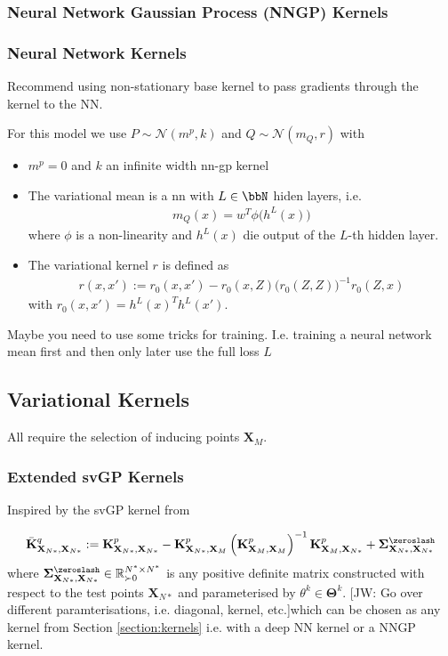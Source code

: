 \documentclass{article}
\newcommand{\jw}[1]{{\color{gray} [JW: #1]}}
\numberwithin{equation}{section}
\begin{document}
\subsubsection{Neural Network Gaussian Process (NNGP) Kernels}
\subsubsection{Neural Network Kernels}
Recommend using non-stationary base kernel to pass gradients through the kernel to the NN. 

For this model we use $P \sim \mathcal{N}(m^p, k) $ and $Q \sim \mathcal{N}(m_Q, r)$ with 
\begin{itemize}
    \item $m^p = 0$ and $k$ an infinite width nn-gp kernel
    \item The variational mean is a nn with $L \in \bbN$ hiden layers, i.e. 
    \begin{align}
        m_Q(x) = w^T \phi\big( h^{L}(x) \big)
    \end{align}
    where $\phi$ is a non-linearity and $h^L(x)$ die output of the $L$-th hidden layer. 
    \item 
    The variational kernel $r$ is defined as 
    \begin{align}
        r(x,x') := r_0(x,x') - r_0(x,Z) \big( r_0(Z,Z) \big)^{-1} r_0(Z,x)
    \end{align}
    with $r_0(x,x') = h^{L}(x)^T h^{L}(x')$.
\end{itemize}
Maybe you need to use some tricks for training. I.e. training a neural network mean first and then only later use the full loss $L$

\subsection{Variational Kernels}
All require the selection of inducing points $\mathbf{X}_M$. 


\subsubsection{Extended svGP Kernels}
Inspired by the svGP kernel from \cite{titsias2009variational}

\begin{align}
            \bar{\mathbf{K}}^q_{\mathbf{X}_{N*}, \mathbf{X}_{N*}} := \mathbf{K}^p_{\mathbf{X}_{N*}, \mathbf{X}_{N*}} - \mathbf{K}^p_{\mathbf{X}_{N*}, \mathbf{X}_M}\left(\mathbf{K}^p_{\mathbf{X}_{M}, \mathbf{X}_M}\right)^{-1}\mathbf{K}^p_{\mathbf{X}_M, \mathbf{X}_{N*}} + \mathbf{\Sigma}^{\zeroslash}_{\mathbf{X}_{N*}, \mathbf{X}_{N*}} 
\end{align}
where $\mathbf{\Sigma}^{\zeroslash}_{\mathbf{X}_{N*}, \mathbf{X}_{N*}} \in \mathbb{R}^{N^*\times N^*}_{\succ 0}$ is any positive definite matrix constructed with respect to the test points $\mathbf{X}_{N*}$ and parameterised by $\theta^k \in \boldsymbol{\Theta}^k$. \jw{Go over different paramterisations, i.e. diagonal, kernel, etc.}which can be chosen as any kernel from Section \ref{section:kernels} i.e. with a deep NN kernel or a NNGP kernel.
\end{document}
